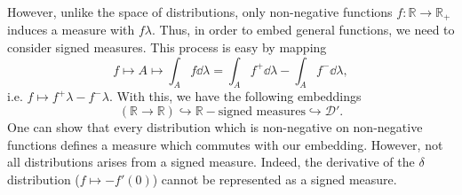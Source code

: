 \documentclass[]{article}
\theoremstyle{definition}
\theoremstyle{definition}
\begin{document}
However, unlike the space of distributions, only non-negative functions 
\(f : \mathbb{R} \to \mathbb{R}_+\) induces a measure with \(f \lambda\). Thus, 
in order to embed general functions, we need to consider signed measures. 
This process is easy by mapping 
\[f \mapsto A \mapsto \int_A f \dd \lambda = \int_A f^+ \dd \lambda - 
  \int_A f^- \dd \lambda,\]
i.e. \(f \mapsto f^+ \lambda - f^- \lambda\). With this, we have the following 
embeddings 
\[(\mathbb{R} \to \mathbb{R}) \hookrightarrow \mathbb{R}-\text{signed measures}
  \hookrightarrow \mathcal{D}'.\]
One can show that every distribution which is non-negative on non-negative functions 
defines a measure which commutes with our embedding. However, not all distributions 
arises from a signed measure. Indeed, the derivative of the 
\(\delta\) distribution (\(f \mapsto -f'(0)\)) cannot be represented as a signed 
measure.
\end{document}
